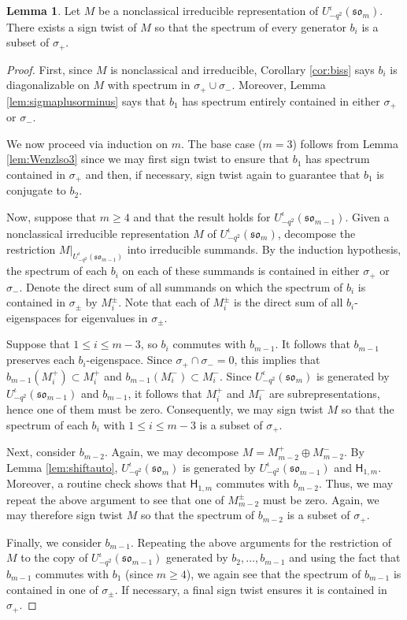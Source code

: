 \documentclass[10pt]{amsart}
\numberwithin{equation}{section}
\theoremstyle{definition}
\newtheorem{lem}[thm]{Lemma}
\newcommand{\som}[1][m]{\mathfrak{so}_{#1}}
\newcommand{\iqUsom}[1][m]{{U}^{\iota}_{-q^2}(\som[#1])}
\newcommand{\hh}{\mathsf{H}}
\begin{document}
\begin{lem}\label{lem:typeIexist}
Let $M$ be a nonclassical irreducible representation of $\iqUsom$. 
There exists a sign twist of $M$ so that the spectrum of every generator $b_i$ is a subset of $\sigma_{+}$.
	\end{lem}
\begin{proof}
First, since $M$ is nonclassical and irreducible, 
Corollary \ref{cor:biss} says $b_i$ is diagonalizable on $M$ with spectrum in $\sigma_{+}\cup \sigma_{-}$. 
Moreover, Lemma \ref{lem:sigmaplusorminus} says that $b_1$ has spectrum entirely contained
in either $\sigma_{+}$ or $\sigma_{-}$.

We now proceed via induction on $m$.
The base case ($m=3$) follows from Lemma \ref{lem:Wenzlso3} since we may first sign twist 
to ensure that $b_1$ has spectrum contained in $\sigma_{+}$ and then,
if necessary, sign twist again to guarantee that $b_1$ is conjugate to $b_2$.

Now, suppose that $m \geq 4$ and that the result holds for $\iqUsom[m-1]$. 
Given a nonclassical irreducible representation $M$ of $\iqUsom$, 
decompose the restriction $M|_{\iqUsom[m-1]}$ into irreducible summands.
By the induction hypothesis, the spectrum of each $b_i$ on each of these summands is 
contained in either $\sigma_{+}$ or $\sigma_{-}$.
Denote the direct sum of all summands on which the spectrum of $b_i$ is contained in 
$\sigma_{\pm}$ by $M_{i}^{\pm}$. Note that each of $M_{i}^{\pm}$ is the direct sum 
of all $b_{i}$-eigenspaces for eigenvalues in $\sigma_{\pm}$.

Suppose that $1 \leq i \leq m-3$, so $b_i$ commutes with $b_{m-1}$. 
It follows that $b_{m-1}$ preserves each $b_i$-eigenspace. 
Since $\sigma_{+} \cap \sigma_{-} = 0$, this implies that $b_{m-1}(M_{i}^{+}) \subset M_{i}^{+}$ 
and $b_{m-1}(M_{i}^{-}) \subset M_{i}^{-}$. 
Since $\iqUsom$ is generated by $\iqUsom[m-1]$ and $b_{m-1}$, 
it follows that $M_{i}^{+}$ and $M_{i}^{-}$ are subrepresentations, hence one of them must be zero.
Consequently, we may sign twist $M$ so that the spectrum of each $b_i$ with $1 \leq i \leq m-3$ 
is a subset of $\sigma_{+}$. 

Next, consider $b_{m-2}$. 
Again, we may decompose $M = M_{m-2}^{+} \oplus M_{m-2}^{-}$.
By Lemma \ref{lem:shiftauto}, $\iqUsom$ is generated by $\iqUsom[m-1]$ and $\hh_{1,m}$. 
Moreover, a routine check shows that $\hh_{1,m}$ commutes with $b_{m-2}$.  
Thus, we may repeat the above argument to see that 
one of $M_{m-2}^{\pm}$ must be zero. Again, we may therefore sign twist $M$ so that 
the spectrum of $b_{m-2}$ is a subset of $\sigma_{+}$.

Finally, we consider $b_{m-1}$. 
Repeating the above arguments for the restriction of $M$ to the copy of $\iqUsom[m-1]$ 
generated by $b_2,\ldots,b_{m-1}$ and using the fact that $b_{m-1}$ commutes with $b_1$ (since $m\ge 4$), 
we again see that the spectrum of $b_{m-1}$ is contained in one of $\sigma_{\pm}$. 
If necessary, a final sign twist ensures it is contained in $\sigma_{+}$.
	\end{proof}
\end{document}

